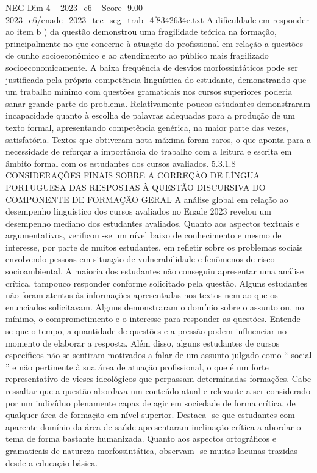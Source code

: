\begin{textsample}{NEG Dim 4 – 2023\_c6 – Score -9.00 – 2023\_c6/enade\_2023\_tec\_seg\_trab\_4f8342634e.txt}
A dificuldade em responder ao item b ) da questão demonstrou uma fragilidade teórica na formação, principalmente no que concerne à atuação do profissional em relação a questões de cunho socioeconômico e ao atendimento ao público mais fragilizado socioeconomicamente.
A baixa frequência de desvios morfossintáticos pode ser justificada pela própria competência linguística do estudante, demonstrando que um trabalho mínimo com questões gramaticais nos cursos superiores poderia sanar grande parte do problema.
Relativamente poucos estudantes demonstraram incapacidade quanto à escolha de palavras adequadas para a produção de um texto formal, apresentando competência genérica, na maior parte das vezes, satisfatória.
Textos que obtiveram nota máxima foram raros, o que aponta para a necessidade de reforçar a importância do trabalho com a leitura e escrita em âmbito formal com os estudantes dos cursos avaliados. 5.3.1.8 CONSIDERAÇÕES FINAIS SOBRE A CORREÇÃO DE LÍNGUA PORTUGUESA DAS RESPOSTAS À QUESTÃO DISCURSIVA DO COMPONENTE DE FORMAÇÃO GERAL A análise global em relação ao desempenho linguístico dos cursos avaliados no Enade 2023 revelou um desempenho mediano dos estudantes avaliados.
Quanto aos aspectos textuais e argumentativos, verificou -se um nível baixo de conhecimento e mesmo de interesse, por parte de muitos estudantes, em refletir sobre os problemas sociais envolvendo pessoas em situação de vulnerabilidade e fenômenos de risco socioambiental.
A maioria dos estudantes não conseguiu apresentar uma análise crítica, tampouco responder conforme solicitado pela questão.
Alguns estudantes não foram atentos às informações apresentadas nos textos nem ao que os enunciados solicitavam.
Alguns demonstraram o domínio sobre o assunto ou, no mínimo, o comprometimento e o interesse para responder as questões.
Entende -se que o tempo, a quantidade de questões e a pressão podem influenciar no momento de elaborar a resposta.
Além disso, alguns estudantes de cursos específicos não se sentiram motivados a falar de um assunto julgado como “ social ” e não pertinente à sua área de atuação profissional, o que é um forte representativo de vieses ideológicos que perpassam determinadas formações.
Cabe ressaltar que a questão abordava um conteúdo atual e relevante a ser considerado por um indivíduo plenamente capaz de agir em sociedade de forma crítica, de qualquer área de formação em nível superior.
Destaca -se que estudantes com aparente domínio da área de saúde apresentaram inclinação crítica a abordar o tema de forma bastante humanizada.
Quanto aos aspectos ortográficos e gramaticais de natureza morfossintática, observam -se muitas lacunas trazidas desde a educação básica.

\end{textsample}
